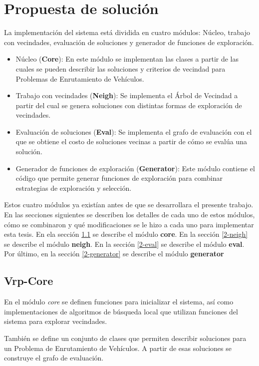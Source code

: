 \chapter{Propuesta de solución}\label{chapter:Solution}

La implementación del sistema está dividida en cuatro módulos: Núcleo, trabajo con vecindades, evaluación de soluciones y generador de funciones de exploración.

\begin{itemize}
	\item Núcleo (\textbf{Core}): En este módulo se implementan las clases a partir de las cuales se pueden describir las soluciones y criterios de vecindad para Problemas de Enrutamiento de Vehículos.
	\item Trabajo con vecindades (\textbf{Neigh}): Se implementa el Árbol de Vecindad a partir del cual se genera soluciones con distintas formas de exploración de vecindades.
	\item Evaluación de soluciones (\textbf{Eval}): Se implementa el grafo de evaluación con el que se obtiene el costo de soluciones vecinas a partir de cómo se evalúa una solución.
	\item Generador de funciones de exploración (\textbf{Generator}): Este módulo contiene el código que permite generar funciones de exploración para combinar estrategias de exploración y selección.
\end{itemize}

Estos cuatro módulos ya existían antes de que se desarrollara el presente trabajo. En las secciones siguientes se describen los detalles de cada uno de estos módulos, cómo se combinaron y qué modificaciones se le hizo a cada uno para implementar esta tesis. En ela sección \ref{2-core} se describe el módulo \textbf{core}. En la sección \ref{2-neigh} se describe el módulo \textbf{neigh}. En la sección \ref{2-eval} se describe el módulo \textbf{eval}. Por último, en la sección \ref{2-generator} se describe el módulo \textbf{generator}

\section{Vrp-Core}\label{2-core}

En el módulo \textit{core} se definen funciones para inicializar el sistema, así como implementaciones de algoritmos de búsqueda local que utilizan funciones del sistema para explorar vecindades.

También se define un conjunto de clases que permiten describir soluciones para un Problema de Enrutamiento de Vehículos. A partir de esas soluciones se construye el grafo de evaluación.

